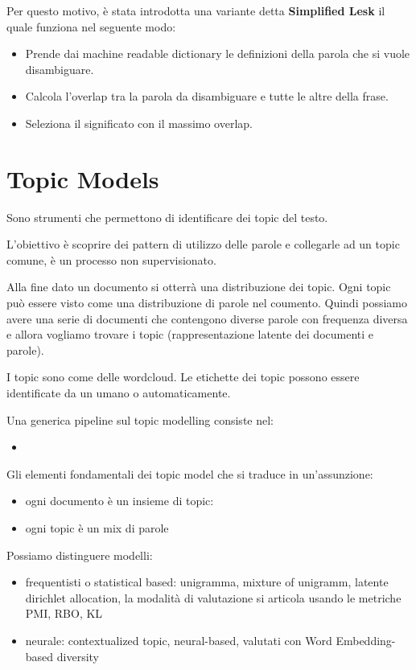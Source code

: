 Per questo motivo, è stata introdotta una variante detta \textbf{Simplified Lesk}
il quale funziona nel seguente modo:
\begin{itemize}
      \item Prende dai machine readable dictionary le definizioni della parola
            che si vuole disambiguare.
      \item Calcola l'overlap tra la parola da disambiguare e tutte le altre
            della frase.
      \item Seleziona il significato con il massimo overlap.
\end{itemize}

\section{Topic Models}
Sono strumenti che permettono di identificare dei topic del testo.

L'obiettivo è scoprire dei pattern di utilizzo delle parole e 
collegarle ad un topic comune, è un processo non supervisionato.

Alla fine dato un documento si otterrà una distribuzione dei topic. Ogni topic 
può essere visto come una distribuzione di parole nel coumento. Quindi possiamo 
avere una serie di documenti che contengono diverse parole con frequenza diversa 
e allora vogliamo trovare i topic (rappresentazione latente dei documenti e parole).

I topic sono come delle wordcloud. Le etichette dei topic possono essere identificate 
da un umano o automaticamente.

Una generica pipeline sul topic modelling consiste nel:
\begin{itemize}
      \item 
\end{itemize}

Gli elementi fondamentali dei topic model che si traduce in un'assunzione:
\begin{itemize}
      \item ogni documento è un insieme di topic: 
      \item ogni topic è un mix di parole
\end{itemize}

Possiamo distinguere modelli:
\begin{itemize}
      \item frequentisti o statistical based: unigramma, mixture of unigramm, latente dirichlet allocation,
      la modalità di valutazione si articola usando le metriche PMI, RBO, KL
      \item neurale: contextualized topic, neural-based, valutati con Word Embedding-based diversity
\end{itemize}


